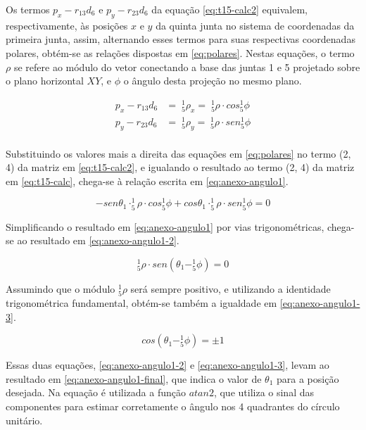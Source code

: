 Os termos $p_x-r_{13}d_6$ e $p_y-r_{23}d_6$ da equação \ref{eq:t15-calc2} equivalem, respectivamente, 
às posições $x$ e $y$ da quinta junta no sistema de coordenadas da primeira junta, assim, alternando esses 
termos para suas respectivas coordenadas polares, obtém-se as relações dispostas em \ref{eq:polares}. Nestas
equações, o termo $\rho$ se refere ao módulo do vetor conectando a base das juntas 1 e 5 projetado sobre o 
plano horizontal $XY$, e $\phi$ o ângulo desta projeção no mesmo plano.

\begin{align}
    \label{eq:polares}
    p_x - r_{13}d_6 &= \; ^1_5\rho_x = \; ^1_5\rho \cdot cos ^1_5\phi \nonumber\\
    p_y - r_{23}d_6 &= \; ^1_5\rho_y = \; ^1_5\rho \cdot sen ^1_5\phi \nonumber\\
\end{align}

Substituindo os valores mais a direita das equações em \ref{eq:polares} no termo (2, 4) 
da matriz em \ref{eq:t15-calc2}, e igualando o resultado ao termo (2, 4) da matriz em 
\ref{eq:t15-calc}, chega-se à relação escrita em \ref{eq:anexo-angulo1}.

\begin{equation}
    \label{eq:anexo-angulo1}
    -sen\theta_1 \cdot ^1_5\rho \cdot cos^1_5\phi + cos\theta_1 \cdot ^1_5\rho \cdot sen^1_5\phi = 0
\end{equation}

Simplificando o resultado em \ref{eq:anexo-angulo1} por vias trigonométricas, chega-se ao resultado em 
\ref{eq:anexo-angulo1-2}.

\begin{equation}
    \label{eq:anexo-angulo1-2}
    ^1_5\rho \cdot sen(\theta_1 - ^1_5\phi) = 0
\end{equation}

Assumindo que o módulo $^1_5\rho$ será sempre positivo, e utilizando a identidade trigonométrica fundamental, 
obtém-se também a igualdade em \ref{eq:anexo-angulo1-3}.

\begin{equation}
    \label{eq:anexo-angulo1-3}
    cos(\theta_1 - ^1_5\phi) = \pm 1
\end{equation}

Essas duas equações, \ref{eq:anexo-angulo1-2} e \ref{eq:anexo-angulo1-3}, levam ao resultado em 
\ref{eq:anexo-angulo1-final}, que indica o valor de $\theta_1$ para a posição desejada. Na equação
é utilizada a função $atan2$, que utiliza o sinal das componentes para estimar corretamente o 
ângulo nos 4 quadrantes do círculo unitário.

